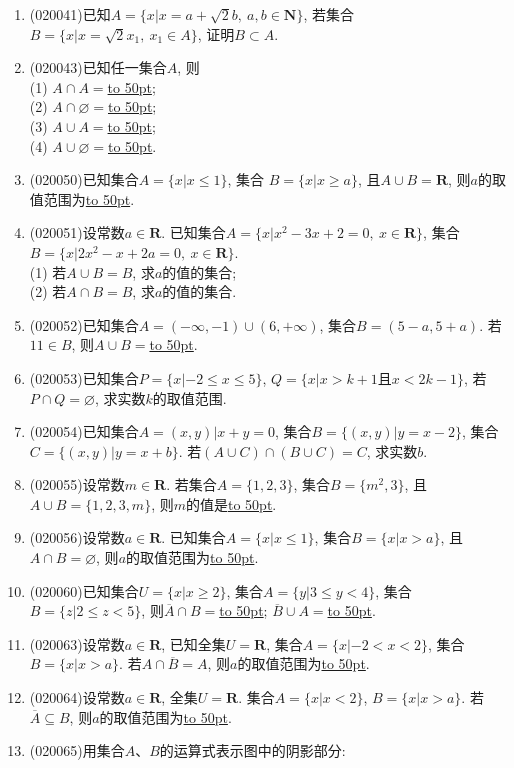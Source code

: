 \documentclass[10pt,a4paper]{article}
\newcommand{\blank}[1]{\underline{\hbox to #1pt{}}}
\begin{document}
\begin{enumerate}[1.]
\item {\tiny (020041)}已知$A=\{x|x=a+\sqrt 2b,\ a,b\in \mathbf{N}\}$, 若集合$B=\{x|x=\sqrt 2x_1,\  x_1 \in A\}$, 证明$B\subset A$.
\item {\tiny (020043)}已知任一集合$A$, 则\\
(1) $A\cap A=$\blank{50};\\
(2) $A\cap\varnothing=$\blank{50};\\
(3) $A\cup A=$\blank{50};\\
(4) $A\cup\varnothing=$\blank{50}.
\item {\tiny (020050)}已知集合$A=\{x| x\le 1\}$, 集合 $B=\{x| x\ge a\}$, 且$A\cup B=\mathbf{R}$, 则$a$的取值范围为\blank{50}.
\item {\tiny (020051)}设常数$a\in \mathbf{R}$. 已知集合$A=\{x|x^2-3x+2=0, \ x\in\mathbf{R}\}$, 集合$B=\{x|2x^2-x+2a=0,\  x\in\mathbf{R}\}$.\\ (1) 若$A\cup B=B$, 求$a$的值的集合;\\
(2) 若$A\cap B=B$, 求$a$的值的集合.
\item {\tiny (020052)}已知集合$A=(-\infty, -1)\cup(6, +\infty)$, 集合$B=(5-a, 5+a)$. 若$11\in B$, 则$A\cup B=$\blank{50}.
\item {\tiny (020053)}已知集合$P=\{ x|-2\le x\le 5\}$, $Q=\{x|x>k+1$且$x<2k-1\}$, 若$P\cap Q=\varnothing$, 求实数$k$的取值范围.
\item {\tiny (020054)}已知集合$A={(x, y)|x+y=0}$, 集合$B=\{(x,y)|y=x-2\}$, 集合$C=\{(x,y)|y=x+b\}$. 若$(A\cup C)\cap(B\cup C)=C$, 求实数$b$.
\item {\tiny (020055)}设常数$m\in \mathbf{R}$. 若集合$A=\{1,2,3\}$, 集合$B=\{m^2,3\}$, 且$A\cup B=\{1,2,3,m\}$, 则$m$的值是\blank{50}.
\item {\tiny (020056)}设常数$a\in \mathbf{R}$. 已知集合$A=\{x| x\le 1\}$, 集合$B=\{x| x>a\}$, 且$A\cap B=\varnothing$, 则$a$的取值范围为\blank{50}.
\item {\tiny (020060)}已知集合$U=\{x|x\ge 2\}$, 集合$A=\{y|3\le y<4\}$, 集合$B=\{z|2\le z<5\}$, 则$\overline A\cap B=$\blank{50}; $\overline B\cup A=$\blank{50}.
\item {\tiny (020063)}设常数$a\in \mathbf{R}$, 已知全集$U=\mathbf{R}$, 集合$A=\{x|-2<x<2\}$, 集合$B=\{x|x>a\}$. 若$A\cap\overline B=A$, 则$a$的取值范围为\blank{50}.
\item {\tiny (020064)}设常数$a\in \mathbf{R}$, 全集$U=\mathbf{R}$. 集合$A=\{x| x<2 \}$, $B=\{x| x>a \}$. 若$\overline A\subseteq B$, 则$a$的取值范围为\blank{50}.
\item {\tiny (020065)}用集合$A$、$B$的运算式表示图中的阴影部分:\\

\end{enumerate}
\end{document}
